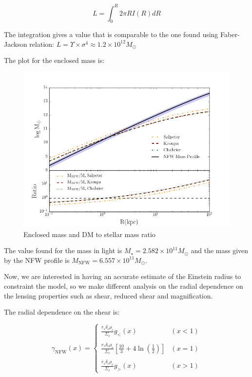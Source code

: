\begin{equation}
L=\int_{0}^{R}2\pi RI(R)dR
\end{equation}

The integration gives a value that is comparable to the one found using Faber-Jackson relation: $L=\Upsilon\times\sigma^{4}\approx 1.2\times 10^{12}M_{\odot}$

The plot for the enclosed mass is:

\begin{figure}[H]
\centering
\includegraphics[width=12cm]{images/DM_fraction_all_IMFs.png}
\caption[Enclosed mass and DM to stellar mass ratio]{Enclosed mass and DM to stellar mass ratio}
\end{figure}

The value found for the mass in light is $M_{\star}=2.582\times 10^{11}M_{\odot}$ and the mass given by the NFW profile is $M_{\text{NFW}}=6.557\times 10^{11}M_{\odot}$.

Now, we are interested in having an accurate estimate of the Einstein radius to constraint the model, so we make different analysis on the radial dependence on the lensing properties such as shear, reduced shear and magnification.

The radial dependence on the shear is:

\begin{equation}
\gamma_{\text{NFW}}(x) = \left\lbrace
\begin{array}{lll}
\frac{r_{s}\delta_{c}\rho_{c}}{\Sigma_c}g_{<}(x) & (x<1)\\\\
\frac{r_{s}\delta_{c}\rho_{c}}{\Sigma_c}\left[\frac{10}{3}+4 \ln \left(\frac{1}{2}\right)\right] & (x=1)\\\\
\frac{r_{s}\delta_{c}\rho_{c}}{\Sigma_c}g_{>}(x) & (x>1)
\end{array}
\right.
\end{equation} 

